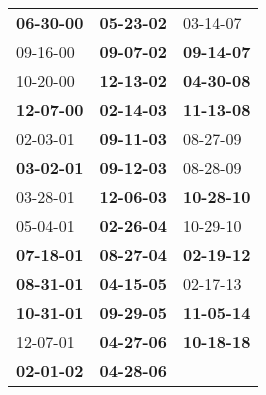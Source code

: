 \begin{supertabular}{p{0.33\columnwidth}p{0.33\columnwidth}p{0.33\columnwidth}}
 \textbf{06-30-00\textsuperscript{}} &  \textbf{05-23-02\textsuperscript{}} &           03-14-07\textsuperscript{} \\
          09-16-00\textsuperscript{} &  \textbf{09-07-02\textsuperscript{}} &  \textbf{09-14-07\textsuperscript{}} \\
          10-20-00\textsuperscript{} &  \textbf{12-13-02\textsuperscript{}} &  \textbf{04-30-08\textsuperscript{}} \\
 \textbf{12-07-00\textsuperscript{}} &  \textbf{02-14-03\textsuperscript{}} &  \textbf{11-13-08\textsuperscript{}} \\
          02-03-01\textsuperscript{} &  \textbf{09-11-03\textsuperscript{}} &           08-27-09\textsuperscript{} \\
 \textbf{03-02-01\textsuperscript{}} &  \textbf{09-12-03\textsuperscript{}} &           08-28-09\textsuperscript{} \\
          03-28-01\textsuperscript{} &  \textbf{12-06-03\textsuperscript{}} &  \textbf{10-28-10\textsuperscript{}} \\
          05-04-01\textsuperscript{} &  \textbf{02-26-04\textsuperscript{}} &           10-29-10\textsuperscript{} \\
 \textbf{07-18-01\textsuperscript{}} &  \textbf{08-27-04\textsuperscript{}} &  \textbf{02-19-12\textsuperscript{}} \\
 \textbf{08-31-01\textsuperscript{}} &  \textbf{04-15-05\textsuperscript{}} &           02-17-13\textsuperscript{} \\
 \textbf{10-31-01\textsuperscript{}} &  \textbf{09-29-05\textsuperscript{}} &  \textbf{11-05-14\textsuperscript{}} \\
          12-07-01\textsuperscript{} &  \textbf{04-27-06\textsuperscript{}} &  \textbf{10-18-18\textsuperscript{}} \\
 \textbf{02-01-02\textsuperscript{}} &  \textbf{04-28-06\textsuperscript{}} &                                      \\
\end{supertabular}
